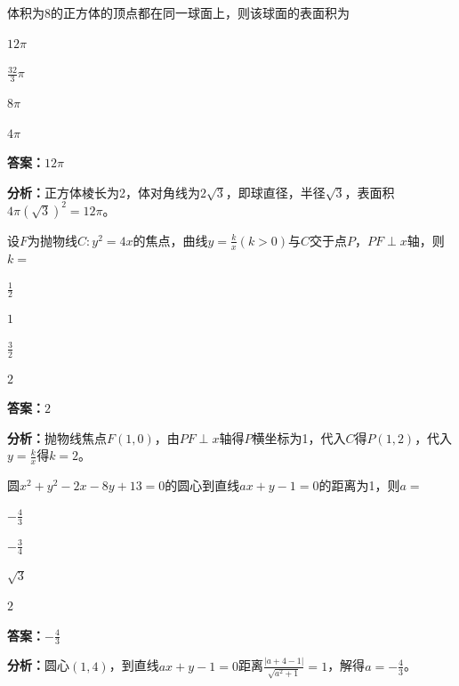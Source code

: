 \begin{question}[points=5]
体积为8的正方体的顶点都在同一球面上，则该球面的表面积为
\begin{choices}
  \item $12\pi$
  \item $\frac{32}{3}\pi$
  \item $8\pi$
  \item $4\pi$
\end{choices}
\begin{solution}
\textbf{答案：}$12\pi$

\textbf{分析：}正方体棱长为2，体对角线为$2\sqrt{3}$，即球直径，半径$\sqrt{3}$，表面积$4\pi(\sqrt{3})^2=12\pi$。
\end{solution}
\end{question}

\begin{question}[points=5]
设$F$为抛物线$C:y^2=4x$的焦点，曲线$y=\frac{k}{x}(k>0)$与$C$交于点$P$，$PF\perp x$轴，则$k=$
\begin{choices}
  \item $\frac{1}{2}$
  \item $1$
  \item $\frac{3}{2}$
  \item $2$
\end{choices}
\begin{solution}
\textbf{答案：}$2$

\textbf{分析：}抛物线焦点$F(1,0)$，由$PF\perp x$轴得$P$横坐标为1，代入$C$得$P(1,2)$，代入$y=\frac{k}{x}$得$k=2$。
\end{solution}
\end{question}

\begin{question}[points=5]
圆$x^2+y^2-2x-8y+13=0$的圆心到直线$ax+y-1=0$的距离为1，则$a=$
\begin{choices}
  \item $-\frac{4}{3}$
  \item $-\frac{3}{4}$
  \item $\sqrt{3}$
  \item $2$
\end{choices}
\begin{solution}
\textbf{答案：}$-\frac{4}{3}$

\textbf{分析：}圆心$(1,4)$，到直线$ax+y-1=0$距离$\frac{|a+4-1|}{\sqrt{a^2+1}}=1$，解得$a=-\frac{4}{3}$。
\end{solution}
\end{question}

